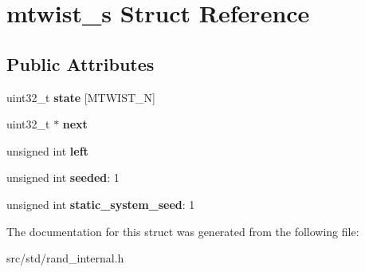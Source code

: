 \hypertarget{structmtwist__s}{}\section{mtwist\+\_\+s Struct Reference}
\label{structmtwist__s}
\subsection*{Public Attributes}
\begin{DoxyCompactItemize}
\item 
\mbox{\label{structmtwist__s_a96a4dbbe0df707851f9a7b4a79fc9ad2}} 
uint32\+\_\+t {\bfseries state} \mbox{[}M\+T\+W\+I\+S\+T\+\_\+N\mbox{]}
\item 
\mbox{\label{structmtwist__s_ab7e52acd47fb5e00211e949a4c6e60cb}} 
uint32\+\_\+t $\ast$ {\bfseries next}
\item 
\mbox{\label{structmtwist__s_aef7431aff2c9111ac6b44f32c9b86651}} 
unsigned int {\bfseries left}
\item 
\mbox{\label{structmtwist__s_a85b4dc87f0b25345c64d38c6cc8dea63}} 
unsigned int {\bfseries seeded}\+: 1
\item 
\mbox{\label{structmtwist__s_a6b3a71681b676632a1238d50a20df5ef}} 
unsigned int {\bfseries static\+\_\+system\+\_\+seed}\+: 1
\end{DoxyCompactItemize}


The documentation for this struct was generated from the following file\+:\begin{DoxyCompactItemize}
\item 
src/std/rand\+\_\+internal.\+h\end{DoxyCompactItemize}
